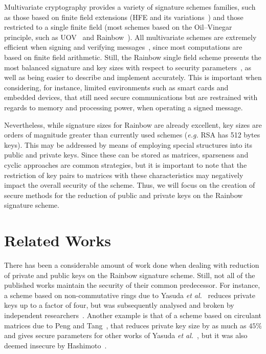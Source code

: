 \documentclass[10pt]{article}
\begin{document}
Multivariate cryptography provides a variety of signature schemes families, such as those based on finite field extensions (HFE and its variations~\cite{Patarin:inproc:1996:may}) and those restricted to a single finite field (most schemes based on the Oil--Vinegar principle, such as UOV~\cite{Kipnis:inproc:1999:apr} and Rainbow~\cite{Ding:inproc:2005:jun}). All multivariate schemes are extremely efficient when signing and verifying messages~\cite{Ding:book:2006}, since most computations are based on finite field arithmetic. Still, the Rainbow single field scheme presents the most balanced signature and key sizes with respect to security parameters~\cite{Ding:article:2017:jul}, as well as being easier to describe and implement accurately. This is important when considering, for instance, limited environments such as smart cards and embedded devices, that still need secure communications but are restrained with regards to memory and processing power, when operating a signed message.

Nevertheless, while signature sizes for Rainbow are already excellent, key sizes are orders of magnitude greater than currently used schemes (\emph{e.g.} RSA has 512 bytes keys). This may be addressed by means of employing special structures into its public and private keys. Since these can be stored as matrices, sparseness and cyclic approaches are common strategies, but it is important to note that the restriction of key pairs to matrices with these characteristics may negatively impact the overall security of the scheme. Thus, we will focus on the creation of secure methods for the reduction of public and private keys on the Rainbow signature scheme.

\section{Related Works}

There has been a considerable amount of work done when dealing with reduction of private and public keys on the Rainbow signature scheme. Still, not all of the published works maintain the security of their common predecessor. For instance, a scheme based on non-commutative rings due to Yasuda \emph{et al.}~\cite{Yasuda:inproc:2012:feb} reduces private keys up to a factor of four, but was subsequently analysed and broken by independent researchers~\cite{Hashimoto:inproc:2013:feb,Thomae:inproc:2012:sep}. Another example is that of a scheme based on circulant matrices due to Peng and Tang~\cite{Peng:article:2017:jun}, that reduces private key size by as much as $45\%$ and gives secure parameters for other works of Yasuda \emph{et al.}~\cite{Yasuda:inproc:2013:may,Yasuda:inproc:2014:apr}, but it was also deemed insecure by Hashimoto~\cite{Hashimoto:misc:2018:oct}. 
\end{document}
